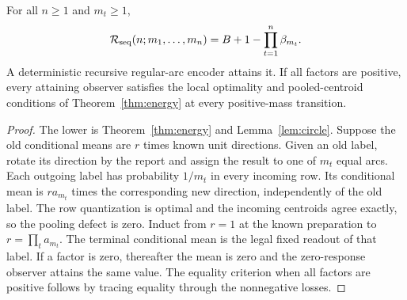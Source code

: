 \begin{theorem}\label{thm:circle-product}
For all $n\ge1$ and $m_t\ge1$,
\begin{equation}\label{eq:circle-product}
 \mathcal R_{\rm seq}(n;m_1,\ldots,m_n)
 =B+1-\prod_{t=1}^n\beta_{m_t}.
\end{equation}
A deterministic recursive regular-arc encoder attains it. If all factors are positive, every attaining observer satisfies the local optimality and pooled-centroid conditions of Theorem~\ref{thm:energy} at every positive-mass transition.
\end{theorem}
\begin{proof}
The lower is Theorem~\ref{thm:energy} and Lemma~\ref{lem:circle}. Suppose the old conditional means are $r$ times known unit directions. Given an old label, rotate its direction by the report and assign the result to one of $m_t$ equal arcs. Each outgoing label has probability $1/m_t$ in every incoming row. Its conditional mean is $r a_{m_t}$ times the corresponding new direction, independently of the old label. The row quantization is optimal and the incoming centroids agree exactly, so the pooling defect is zero. Induct from $r=1$ at the known preparation to $r=\prod_t a_{m_t}$. The terminal conditional mean is the legal fixed readout of that label. If a factor is zero, thereafter the mean is zero and the zero-response observer attains the same value. The equality criterion when all factors are positive follows by tracing equality through the nonnegative losses.
\end{proof}

